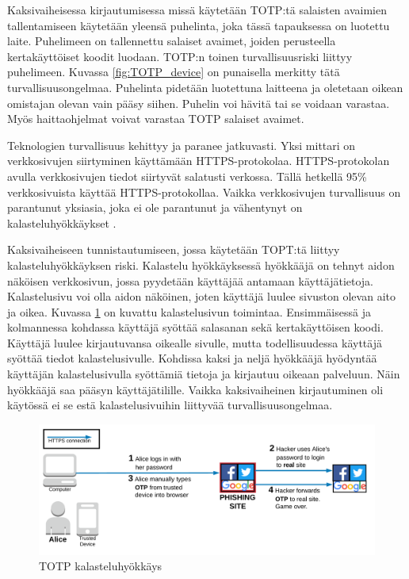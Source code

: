 Kaksivaiheisessa kirjautumisessa missä käytetään TOTP:tä salaisten avaimien tallentamiseen käytetään yleensä puhelinta, joka tässä tapauksessa on luotettu laite. Puhelimeen on tallennettu salaiset avaimet, joiden perusteella kertakäyttöiset koodit luodaan. TOTP:n toinen turvallisuusriski liittyy puhelimeen. Kuvassa \ref{fig:TOTP_device} on punaisella merkitty tätä turvallisuusongelmaa. Puhelinta pidetään luotettuna laitteena ja oletetaan oikean omistajan olevan vain pääsy siihen. Puhelin voi hävitä tai se voidaan varastaa. Myös haittaohjelmat voivat varastaa TOTP salaiset avaimet. 

Teknologien turvallisuus kehittyy ja paranee jatkuvasti. Yksi mittari on verkkosivujen siirtyminen käyttämään HTTPS-protokolaa. HTTPS-protokolan avulla verkkosivujen tiedot siirtyvät salatusti verkossa. Tällä hetkellä 95\% verkkosivuista käyttää HTTPS-protokollaa. Vaikka verkkosivujen turvallisuus on parantunut yksiasia, joka ei ole parantunut ja vähentynyt on kalasteluhyökkäykset \citep{google_transparency_report} \citep{phishing_scams}.

Kaksivaiheiseen tunnistautumiseen, jossa käytetään TOPT:tä liittyy kalasteluhyökkäyksen riski. Kalastelu hyökkäyksessä hyökkääjä on tehnyt aidon näköisen verkkosivun, jossa pyydetään käyttäjää antamaan käyttäjätietoja. Kalastelusivu voi olla aidon näköinen, joten käyttäjä luulee sivuston olevan aito ja oikea. Kuvassa \ref{fig:TOTP_phishing} on kuvattu kalastelusivun toimintaa. Ensimmäisessä ja kolmannessa kohdassa käyttäjä syöttää salasanan sekä kertakäyttöisen koodi. Käyttäjä luulee kirjautuvansa oikealle sivulle, mutta todellisuudessa käyttäjä syöttää tiedot kalastelusivulle. Kohdissa kaksi ja neljä hyökkääjä hyödyntää käyttäjän kalastelusivulla syöttämiä tietoja ja kirjautuu oikeaan palveluun. Näin hyökkääjä saa pääsyn käyttäjätilille. Vaikka kaksivaiheinen kirjautuminen oli käytössä ei se estä kalastelusivuihin liittyvää turvallisuusongelmaa.

\begin{figure}[ht]
    \centering
    \includegraphics[width=15cm]{template/figures/totp phishing attack.png}
    \caption{TOTP kalasteluhyökkäys \citep{TOTP}}
    \label{fig:TOTP_phishing}
\end{figure}

